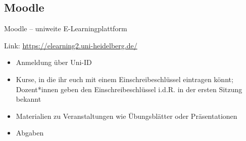 
\subsection{Moodle}
\begin{frame}{Moodle -- uniweite E-Learningplattform}

    Link: \url{https://elearning2.uni-heidelberg.de/}

    \begin{center}
    \end{center}

    \begin{itemize}
        \item Anmeldung über Uni-ID
        \item{Kurse, in die ihr euch mit einem Einschreibeschlüssel eintragen könnt; Dozent*innen geben den Einschreibeschlüssel i.d.R. in der ersten Sitzung bekannt}
        \item{Materialien zu Veranstaltungen wie Übungsblätter oder Präsentationen}
        \item{Abgaben}
    \end{itemize}

\end{frame}

